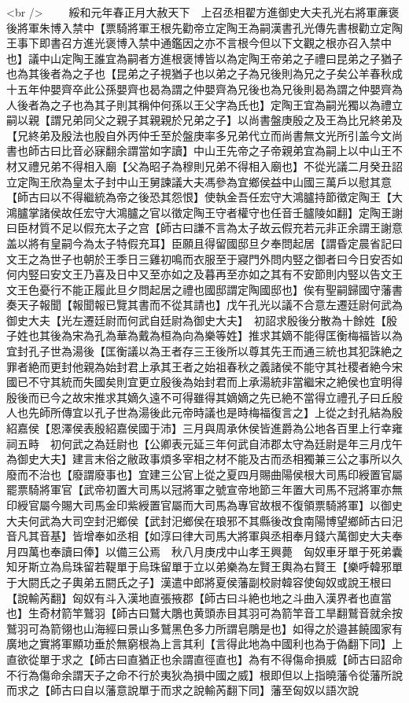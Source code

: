 <br />
　　綏和元年春正月大赦天下　上召丞相翟方進御史大夫孔光右將軍亷褒後將軍朱博入禁中【票騎將軍王根先勸帝立定陶王為嗣漢書孔光傳先書根勸立定陶王事下即書召方進光褒博入禁中通鑑因之亦不言根今但以下文觀之根亦召入禁中也】議中山定陶王誰宜為嗣者方進根褒博皆以為定陶王帝弟之子禮曰昆弟之子猶子也為其後者為之子也【昆弟之子視猶子也以弟之子為兄後則為兄之子矣公羊春秋成十五年仲嬰齊卒此公孫嬰齊也曷為謂之仲嬰齊為兄後也為兄後則曷為謂之仲嬰齊為人後者為之子也為其子則其稱仲何孫以王父字為氏也】定陶王宜為嗣光獨以為禮立嗣以親【謂兄弟同父之親子其親親於兄弟之子】以尚書盤庚殷之及王為比兄終弟及【兄終弟及殷法也殷自外丙仲壬至於盤庚率多兄弟代立而尚書無文光所引盖今文尚書也師古曰比音必寐翻余謂當如字讀】中山王先帝之子帝親弟宜為嗣上以中山王不材又禮兄弟不得相入廟【父為昭子為穆則兄弟不得相入廟也】不從光議二月癸丑詔立定陶王欣為皇太子封中山王舅諫議大夫馮參為宜鄉侯益中山國三萬戶以慰其意【師古曰以不得繼統為帝之後恐其怨恨】使執金吾任宏守大鴻臚持節徵定陶王【大鴻臚掌諸侯故任宏守大鴻臚之官以徵定陶王守者權守也任音壬臚陵如翻】定陶王謝曰臣材質不足以假充太子之宫【師古曰謙不言為太子故云假充若元非正余謂王謝意盖以將有皇嗣今為太子特假充耳】臣願且得留國邸旦夕奉問起居【謂昏定晨省記曰文王之為世子也朝於王季日三雞初鳴而衣服至于寢門外問内竪之御者曰今日安否如何内竪曰安文王乃喜及日中又至亦如之及暮再至亦如之其有不安節則内竪以告文王文王色憂行不能正履此旦夕問起居之禮也國邸謂定陶國邸也】俟有聖嗣歸國守藩書奏天子報聞【報聞報已覽其書而不從其請也】戊午孔光以議不合意左遷廷尉何武為御史大夫【光左遷廷尉而何武自廷尉為御史大夫】　初詔求殷後分散為十餘姓【殷子姓也其後為宋為孔為華為戴為桓為向為樂等姓】推求其嫡不能得匡衡梅福皆以為宜封孔子世為湯後【匡衡議以為王者存三王後所以尊其先王而通三統也其犯誅絶之罪者絶而更封他親為始封君上承其王者之始祖春秋之義諸侯不能守其社稷者絶今宋國已不守其統而失國矣則宜更立殷後為始封君而上承湯統非當繼宋之絶侯也宜明得殷後而已今之故宋推求其嫡久遠不可得雖得其嫡嫡之先已絶不當得立禮孔子曰丘殷人也先師所傳宜以孔子世為湯後此元帝時議也是時梅福復言之】上從之封孔結為殷紹嘉侯【恩澤侯表殷紹嘉侯國于沛】三月與周承休侯皆進爵為公地各百里上行幸雍祠五畤　初何武之為廷尉也【公卿表元延三年何武自沛郡太守為廷尉是年三月戊午為御史大夫】建言末俗之敝政事煩多宰相之材不能及古而丞相獨兼三公之事所以久廢而不治也【廢謂廢事也】宜建三公官上從之夏四月賜曲陽侯根大司馬印綬置官屬罷票騎將軍官【武帝初置大司馬以冠將軍之號宣帝地節三年置大司馬不冠將軍亦無印綬官屬今賜大司馬金印紫綬置官屬而大司馬為專官故根不復領票騎將軍】以御史大夫何武為大司空封汜鄉侯【武封汜鄉侯在琅邪不其縣後改食南陽博望鄉師古曰汜音凡其音基】皆增奉如丞相【如淳曰律大司馬大將軍與丞相奉月錢六萬御史大夫奉月四萬也奉讀曰俸】以備三公焉　秋八月庚戌中山孝王興薨　匈奴車牙單于死弟囊知牙斯立為烏珠留若鞮單于烏珠留單于立以弟樂為左賢王輿為右賢王【樂呼韓邪單于大閼氏之子輿弟五閼氏之子】漢遣中郎將夏侯藩副校尉韓容使匈奴或說王根曰【說輸芮翻】匈奴有斗入漢地直張掖郡【師古曰斗絶也地之斗曲入漢界者也直當也】生奇材箭竿鷲羽【師古曰鷲大鵰也黄頭赤目其羽可為箭竿音工旱翻鷲音就余按鷲羽可為箭翎也山海經曰景山多鷲黑色多力所謂皂鵰是也】如得之於邉甚饒國家有廣地之實將軍顯功垂於無窮根為上言其利【言得此地為中國利也為于偽翻下同】上直欲從單于求之【師古曰直猶正也余謂直徑直也】為有不得傷命損威【師古曰詔命不行為傷命余謂天子之命不行於夷狄為損中國之威】根即但以上指曉藩令從藩所說而求之【師古曰自以藩意說單于而求之說輸芮翻下同】藩至匈奴以語次說